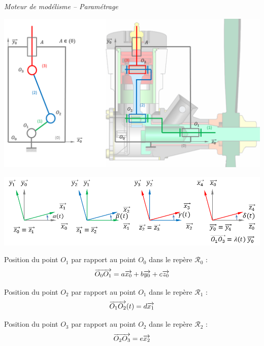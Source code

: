 \documentclass[10pt,oneside]{article}
\begin{document}
\begin{exemple}
\textit{Moteur de modélisme -- Paramétrage}

\begin{center}
\includegraphics[width=.75\textwidth]{png/moteur_2d_sch}
\end{center}
\begin{center}
\includegraphics[width=.85\textwidth]{png/param}
\end{center}

Position du point $O_1$ par rapport au point $O_0$ dans le repère $\mathcal{R}_0$ : 
$$
\overrightarrow{O_0 O_1}= a\overrightarrow{x_0}+b\overrightarrow{y_0}+c\overrightarrow{z_0}
$$

Position du point $O_2$ par rapport au point $O_1$ dans le repère $\mathcal{R}_1$ : 
$$
\overrightarrow{O_1 O_2}(t)= d\overrightarrow{x_1}
$$


Position du point $O_3$ par rapport au point $O_2$ dans le repère $\mathcal{R}_2$ : 
$$
\overrightarrow{O_2 O_3}= e\overrightarrow{x_2}
$$




\end{exemple}
\end{document}
